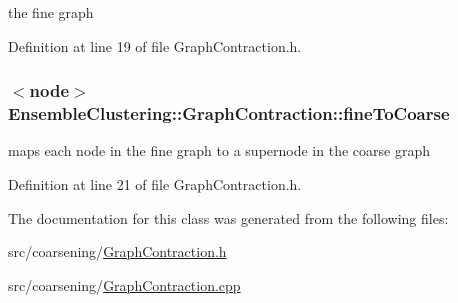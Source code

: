 the fine graph 



Definition at line 19 of file Graph\-Contraction.\-h.

\hypertarget{class_ensemble_clustering_1_1_graph_contraction_a32c7c2bc182c687a1c5fffaf715f6541}{
\subsubsection[{fine\-To\-Coarse}]{$<${\bf node}$>$ Ensemble\-Clustering\-::\-Graph\-Contraction\-::fine\-To\-Coarse\hspace{0.3cm}{\ttfamily [protected]}}}\label{class_ensemble_clustering_1_1_graph_contraction_a32c7c2bc182c687a1c5fffaf715f6541}


maps each node in the fine graph to a supernode in the coarse graph 



Definition at line 21 of file Graph\-Contraction.\-h.



The documentation for this class was generated from the following files\-:\begin{DoxyCompactItemize}
\item 
src/coarsening/\hyperlink{_graph_contraction_8h}{Graph\-Contraction.\-h}\item 
src/coarsening/\hyperlink{_graph_contraction_8cpp}{Graph\-Contraction.\-cpp}\end{DoxyCompactItemize}

